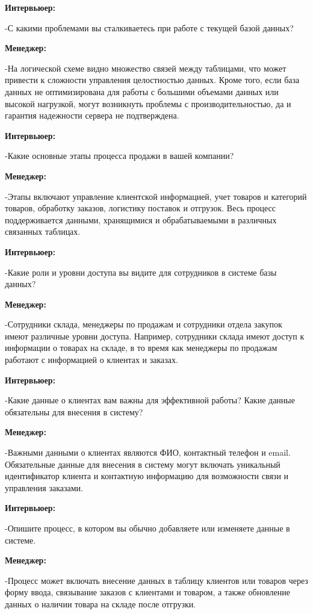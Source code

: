 \documentclass[14pt]{extreport}
\begin{document}
\textbf{Интервьюер:}

-С какими проблемами вы сталкиваетесь при работе с текущей базой данных?


\textbf{Менеджер:}

-На логической схеме видно множество связей между таблицами, что может привести к сложности управления целостностью данных. Кроме того, если база данных не оптимизирована для работы с большими объемами данных или высокой нагрузкой, могут возникнуть проблемы с производительностью, да и гарантия надежности сервера не подтверждена.


\textbf{Интервьюер:}

-Какие основные этапы процесса продажи в вашей компании?

\textbf{Менеджер:}

-Этапы включают управление клиентской информацией, учет товаров и категорий товаров, обработку заказов, логистику поставок и отгрузок. Весь процесс поддерживается данными, хранящимися и обрабатываемыми в различных связанных таблицах.


\textbf{Интервьюер:}

-Какие роли и уровни доступа вы видите для сотрудников в системе базы
данных?


\textbf{Менеджер:}

-Сотрудники склада, менеджеры по продажам и сотрудники отдела закупок имеют различные уровни доступа. Например, сотрудники склада имеют доступ к информации о товарах на складе, в то время как менеджеры по продажам работают с информацией о клиентах и заказах.


\textbf{Интервьюер:}

-Какие данные о клиентах вам важны для эффективной работы? Какие
данные обязательны для внесения в систему?


\textbf{Менеджер:}

-Важными данными о клиентах являются ФИО, контактный телефон и email. Обязательные данные для внесения в систему могут включать уникальный идентификатор клиента и контактную информацию для возможности связи и управления заказами.


\textbf{Интервьюер:}

-Опишите процесс, в котором вы обычно добавляете или изменяете данные в системе.


\textbf{Менеджер:}

-Процесс может включать внесение данных в таблицу клиентов или товаров через форму ввода, связывание заказов с клиентами и товаром, а также обновление данных о наличии товара на складе после отгрузки.
\end{document}
